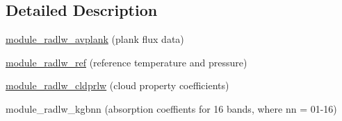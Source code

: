\subsection{Detailed Description}

\begin{DoxyItemize}
\item \hyperlink{namespacemodule__radlw__avplank}{module\+\_\+radlw\+\_\+avplank} (plank flux data)
\item \hyperlink{namespacemodule__radlw__ref}{module\+\_\+radlw\+\_\+ref} (reference temperature and pressure)
\item \hyperlink{namespacemodule__radlw__cldprlw}{module\+\_\+radlw\+\_\+cldprlw} (cloud property coefficients)
\item module\+\_\+radlw\+\_\+kgbnn (absorption coeffients for 16 bands, where nn = 01-\/16) 
\end{DoxyItemize}